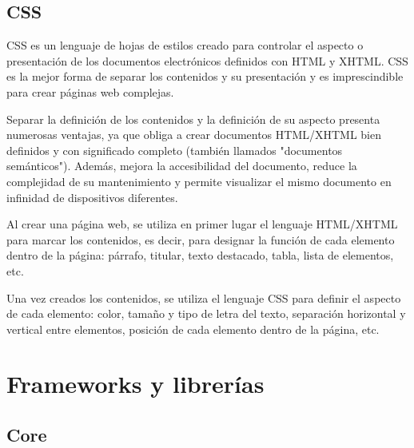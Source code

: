 \documentclass[12pt, a4paper, twoside]{book}
\begin{document}
	\subsection{CSS}
	CSS es un lenguaje de hojas de estilos creado para controlar el aspecto o presentación de los documentos electrónicos definidos con HTML y XHTML. CSS es la mejor forma de separar los contenidos y su presentación y es imprescindible para crear páginas web complejas.
	
	Separar la definición de los contenidos y la definición de su aspecto presenta numerosas ventajas, ya que obliga a crear documentos HTML/XHTML bien definidos y con significado completo (también llamados "documentos semánticos"). Además, mejora la accesibilidad del documento, reduce la complejidad de su mantenimiento y permite visualizar el mismo documento en infinidad de dispositivos diferentes.
	
	Al crear una página web, se utiliza en primer lugar el lenguaje HTML/XHTML para marcar los contenidos, es decir, para designar la función de cada elemento dentro de la página: párrafo, titular, texto destacado, tabla, lista de elementos, etc.
	
	Una vez creados los contenidos, se utiliza el lenguaje CSS para definir el aspecto de cada elemento: color, tamaño y tipo de letra del texto, separación horizontal y vertical entre elementos, posición de cada elemento dentro de la página, etc.\cite{CSS}
	\section{Frameworks y librerías}
	\subsection{Core}
\end{document}
